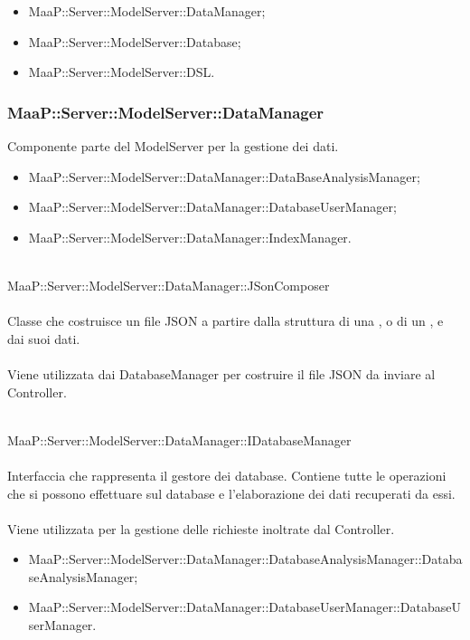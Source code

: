 \begin{itemize}
\item MaaP::Server::ModelServer::DataManager;
\item MaaP::Server::ModelServer::Database;
\item MaaP::Server::ModelServer::DSL.
\end{itemize}

\subsubsection{MaaP::Server::ModelServer::DataManager}
Componente parte del ModelServer per la gestione dei dati.
\begin{itemize}
\item MaaP::Server::ModelServer::DataManager::DataBaseAnalysisManager;
\item MaaP::Server::ModelServer::DataManager::DatabaseUserManager;
\item MaaP::Server::ModelServer::DataManager::IndexManager.
\end{itemize}

\\
MaaP::Server::ModelServer::DataManager::JSonComposer\\
\\
Classe che costruisce un file JSON a partire dalla struttura di una , o di un , e dai suoi dati.\\
\\
Viene utilizzata dai DatabaseManager per costruire il file JSON da inviare al Controller.

\\
MaaP::Server::ModelServer::DataManager::IDatabaseManager\\
\\
Interfaccia che rappresenta il gestore dei database. Contiene tutte le operazioni che si possono effettuare sul database e l'elaborazione dei dati recuperati da essi.\\
\\
Viene utilizzata per la gestione delle richieste inoltrate dal Controller.\\
\begin{itemize}
\item MaaP::Server::ModelServer::DataManager::DatabaseAnalysisManager::DatabaseAnalysisManager;
\item MaaP::Server::ModelServer::DataManager::DatabaseUserManager::DatabaseUserManager.
\end{itemize}

